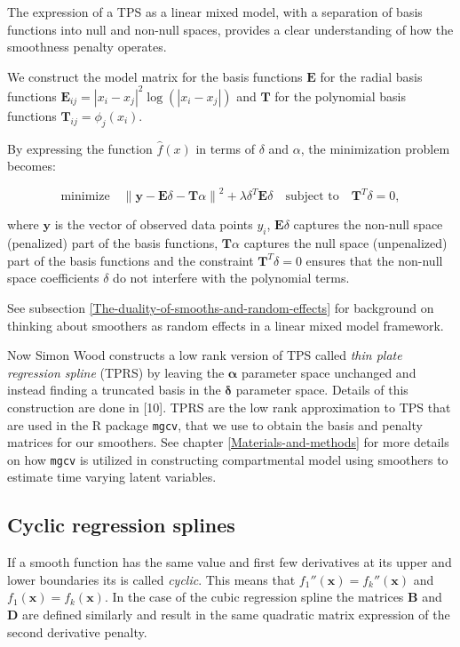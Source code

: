 \documentclass[
11pt, %
oneside, %
english, %
singlespacing, %
]{macthesis} %
\begin{document}
The expression of a TPS as a linear mixed model, with a separation of basis functions into null and non-null spaces, provides a clear understanding of how the smoothness penalty operates.

We construct the model matrix for the basis functions \(\mathbf{E}\) for the radial basis functions \(\mathbf{E}_{ij} = |x_i - x_j|^2 \log(|x_i - x_j|)\) and \(\mathbf{T}\) for the polynomial basis functions \(\mathbf{T}_{ij} = \phi_j(x_i)\).

By expressing the function \(\hat{f}(x)\) in terms of \(\delta\) and \(\alpha\), the minimization problem becomes:

\[
\text{minimize} \quad \left\| \mathbf{y} - \mathbf{E} \delta - \mathbf{T} \alpha \right\|^2 + \lambda \delta^T \mathbf{E} \delta \quad \text{subject to} \quad \mathbf{T}^T \delta = 0,
\]

where \(\mathbf{y}\) is the vector of observed data points \(y_i\), \(\mathbf{E} \delta\) captures the non-null space (penalized) part of the basis functions, \(\mathbf{T} \alpha\) captures the null space (unpenalized) part of the basis functions and the constraint \(\mathbf{T}^T \delta = 0\) ensures that the non-null space coefficients \(\delta\) do not interfere with the polynomial terms.

See subsection \ref{The-duality-of-smooths-and-random-effects} for background on thinking about smoothers as random effects in a linear mixed model framework.

Now Simon Wood constructs a low rank version of TPS called \emph{thin plate regression spline} (TPRS) by leaving the \(\mathbf{\alpha}\) parameter space unchanged and instead finding a truncated basis in the \(\mathbf{\delta}\) parameter space. Details of this construction are done in {[}10{]}. TPRS are the low rank approximation to TPS that are used in the R package \texttt{mgcv}, that we use to obtain the basis and penalty matrices for our smoothers. See chapter \ref{Materials-and-methods} for more details on how \texttt{mgcv} is utilized in constructing compartmental model using smoothers to estimate time varying latent variables.

\subsection{Cyclic regression splines}\label{Cyclic-regression-splines}

If a smooth function has the same value and first few derivatives at its upper and lower
boundaries its is called \emph{cyclic}. This means that \(f_1''(\mathbf{x}) = f_k''(\mathbf{x})\) and \(f_1(\mathbf{x}) = f_k(\mathbf{x})\). In the case of the cubic regression spline the matrices \(\mathbf{B}\) and \(\mathbf{D}\) are defined similarly and result in the same quadratic matrix expression of the second derivative penalty.
\end{document}
